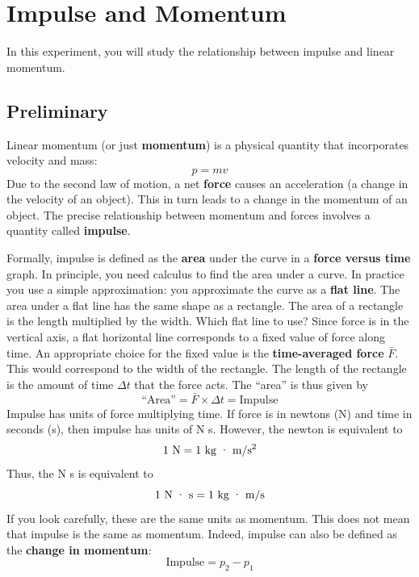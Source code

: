 \setcounter{chapter}{6}
\chapter{Impulse and Momentum}
%
In this experiment, you will study the relationship between impulse and linear momentum.
%
\section{Preliminary}
%
Linear momentum (or just \textbf{momentum}) is a physical quantity that incorporates velocity and mass:
\begin{equation}
    p = m v
\end{equation}
Due to the second law of motion, a net \textbf{force} causes an acceleration (a change in the velocity of an object). This in turn leads to a change in the momentum of an object. The precise relationship between momentum and forces involves a quantity called \textbf{impulse}.

Formally, impulse is defined as the \textbf{area} under the curve in a \textbf{force versus time} graph. In principle, you need calculus to find the area under a curve. In practice you use a simple approximation: you approximate the curve as a \textbf{flat line}. The area under a flat line has the same shape as a rectangle. The area of a rectangle is the length multiplied by the width. Which flat line to use? Since force is in the vertical axis, a flat horizontal line corresponds to a fixed value of force along time. An appropriate choice for the fixed value is the \textbf{time-averaged force} $\bar{F}$. This would correspond to the width of the rectangle. The length of the rectangle is the amount of time $\Delta t$ that the force acts. The ``area'' is thus given by
\begin{equation}
    \text{``Area''} = \bar{F} \times \Delta t = \text{Impulse}
\end{equation}
Impulse has units of force multiplying time. If force is in newtons (N) and time in seconds (s), then impulse has units of N s. However, the newton is equivalent to
\begin{equation}
    1 \ \text{N} = 1 \ \text{kg{ }\textperiodcentered{ }m/s\textsuperscript{2}}
\end{equation}
Thus, the N s is equivalent to
\begin{equation}
    1 \ \text{N{ }\textperiodcentered{ }s} = 1 \ \text{kg{ }\textperiodcentered{ }m/s}
\end{equation}
If you look carefully, these are the same units as momentum. This does not mean that impulse is the same as momentum. Indeed, impulse can also be defined as the \textbf{change in momentum}:
\begin{equation}
    \text{Impulse} = p_{2} - p_{1}
\end{equation}
%
